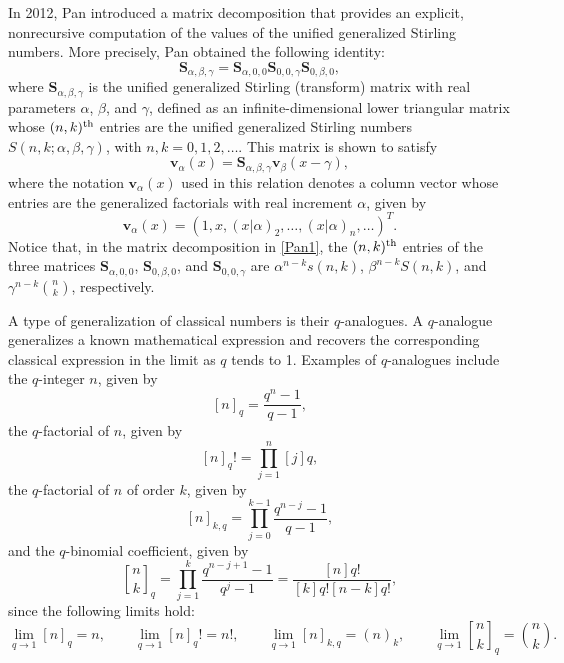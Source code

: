 \documentclass[12pt]{article}
\newcommand{\rstf}[2]{\genfrac{[}{]}{0pt}{0}{#1}{#2}}
\def\S{\mathbf{S}}
\def\v{\mathbf{v}}
\begin{document}
In 2012, Pan \cite{Pan} introduced a matrix decomposition that provides an explicit, nonrecursive computation of the values of the unified generalized Stirling numbers. More precisely, Pan \cite[Equation (8)]{Pan} obtained the following identity:
\begin{equation}
	\S_{\alpha,\beta,\gamma}=\S_{\alpha,0,0}\S_{0,0,\gamma}\S_{0,\beta,0},\label{Pan1}
\end{equation}
where $\S_{\alpha,\beta,\gamma}$ is the unified generalized Stirling (transform) matrix with real parameters $\alpha$, $\beta$, and $\gamma$, defined as an infinite-dimensional lower triangular matrix whose $(n,k)^{\rm th}$ entries are the unified generalized Stirling numbers $S(n,k;\alpha,\beta,\gamma)$, with $n,k=0,1,2,\ldots$. This matrix is shown to satisfy
\begin{equation}
	\v_\alpha(x)=\S_{\alpha,\beta,\gamma}\v_\beta(x-\gamma),
\end{equation}
where the notation $\v_\alpha(x)$ used in this relation denotes a column vector whose entries are the generalized factorials with real increment $\alpha$, given by
\begin{equation}
	\v_\alpha(x)=(1,x,(x|\alpha)_2,\ldots,(x|\alpha)_n,\ldots)^T.
\end{equation}
Notice that, in the matrix decomposition in \eqref{Pan1}, the $(n,k)^{\rm th}$ entries of the three matrices $\S_{\alpha,0,0}$, $\S_{0,\beta,0}$, and $\S_{0,0,\gamma}$ are $\alpha^{n-k}s(n,k)$, $\beta^{n-k}S(n,k)$, and $\gamma^{n-k}\binom{n}{k}$, respectively. 

A type of generalization of classical numbers is their $q$-analogues. A $q$-analogue generalizes a known mathematical expression and recovers the corresponding classical expression in the limit as $q$ tends to 1. Examples of $q$-analogues include the $q$-integer $n$, given by
$$ [n]_q=\frac{q^n-1}{q-1},$$
the $q$-factorial of $n$, given by
$$ [n]_q!=\prod_{j=1}^n[j]q,$$
the $q$-factorial of $n$ of order $k$, given by
$$ [n]_{k,q}=\prod_{j=0}^{k-1}\frac{q^{n-j}-1}{q-1},$$
and the $q$-binomial coefficient, given by
$$ \rstf{n}{k}_q
=\prod_{j=1}^k\frac{q^{n-j+1}-1}{q^j-1}
=\frac{[n]q!}{[k]q![n-k]q!},$$
since the following limits hold:
\begin{equation*}
	\lim_{q\rightarrow 1}[n]_q=n,\qquad
	\lim_{q\rightarrow 1}[n]_q!=n!,\qquad
	\lim_{q\rightarrow 1}[n]_{k,q}=(n)_k,\qquad
	\lim_{q\rightarrow 1}\rstf{n}{k}_q=\binom{n}{k}.
\end{equation*}
\end{document}
